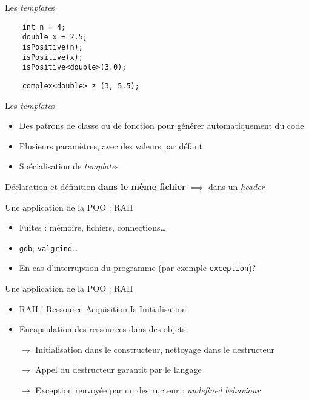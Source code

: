 \begin{frame}[fragile]{Les \textit{template}s}
  \begin{lstlisting}
    int n = 4;
    double x = 2.5;
    isPositive(n);
    isPositive(x);
    isPositive<double>(3.0);
  \end{lstlisting}

  \begin{lstlisting}
    complex<double> z (3, 5.5);
  \end{lstlisting}
\end{frame}

\begin{frame}{Les \textit{template}s}
  \begin{itemize}
  \item  Des patrons de classe ou de fonction pour générer automatiquement du code
  \item Plusieurs paramètres, avec des valeurs par défaut
  \item Spécialisation de \textit{template}s
  \end{itemize}

  Déclaration et définition \textbf{dans le même fichier} $\implies$ dans un \textit{header}
\end{frame}

\begin{frame}{Une application de la POO : RAII}
  \begin{itemize}
  \item Fuites : mémoire, fichiers, connections\dots{}
  \item \texttt{gdb}, \texttt{valgrind}\dots{}
  \item En cas d'interruption du programme (par exemple \texttt{exception})?
  \end{itemize}
\end{frame}

\begin{frame}{Une application de la POO : RAII}
  \begin{itemize}
  \item RAII : Ressource Acquisition Is Initialisation
  \item Encapsulation des ressources dans des objets
  \item[$\rightarrow$] Initialisation dans le constructeur, nettoyage dans le destructeur
  \item[$\rightarrow$] Appel du destructeur garantit par le langage
  \item[$\rightarrow$] Exception renvoyée par un destructeur : \textit{undefined behaviour}
  \end{itemize}
\end{frame}
